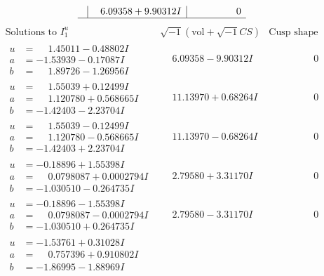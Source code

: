 \documentclass[1p]{elsarticle_modified}
\theoremstyle{definition}
\newcommand{\I}{\sqrt{-1}}
\begin{document}
$$\begin{array}{c|c|c}
 & \phantom{-}6.09358 + 9.90312 I & \phantom{-0.000000 } 0\\
 \hline 
 \end{array}$$\newpage$$\begin{array}{c|c|c}  
\text{Solutions to }I^u_{1}& \I (\text{vol} + \sqrt{-1}CS) & \text{Cusp shape}\\
 \hline 
\begin{aligned}
u &= \phantom{-}1.45011 - 0.48802 I \\
a &= -1.53939 - 0.17087 I \\
b &= \phantom{-}1.89726 - 1.26956 I\end{aligned}
 & \phantom{-}6.09358 - 9.90312 I & \phantom{-0.000000 } 0 \\ \hline\begin{aligned}
u &= \phantom{-}1.55039 + 0.12499 I \\
a &= \phantom{-}1.120780 + 0.568665 I \\
b &= -1.42403 - 2.23704 I\end{aligned}
 & \phantom{-}11.13970 + 0.68264 I & \phantom{-0.000000 } 0 \\ \hline\begin{aligned}
u &= \phantom{-}1.55039 - 0.12499 I \\
a &= \phantom{-}1.120780 - 0.568665 I \\
b &= -1.42403 + 2.23704 I\end{aligned}
 & \phantom{-}11.13970 - 0.68264 I & \phantom{-0.000000 } 0 \\ \hline\begin{aligned}
u &= -0.18896 + 1.55398 I \\
a &= \phantom{-}0.0798087 + 0.0002794 I \\
b &= -1.030510 - 0.264735 I\end{aligned}
 & \phantom{-}2.79580 + 3.31170 I & \phantom{-0.000000 } 0 \\ \hline\begin{aligned}
u &= -0.18896 - 1.55398 I \\
a &= \phantom{-}0.0798087 - 0.0002794 I \\
b &= -1.030510 + 0.264735 I\end{aligned}
 & \phantom{-}2.79580 - 3.31170 I & \phantom{-0.000000 } 0 \\ \hline\begin{aligned}
u &= -1.53761 + 0.31028 I \\
a &= \phantom{-}0.757396 + 0.910802 I \\
b &= -1.86995 - 1.88969 I\end{aligned}

\end{array}$$
\end{document}
